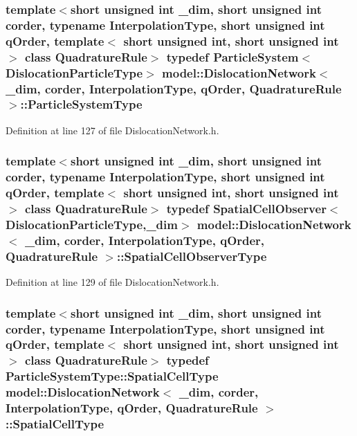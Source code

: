 \subsubsection[{Particle\+System\+Type}]{\setlength{\rightskip}{0pt plus 5cm}template$<$short unsigned int \+\_\+dim, short unsigned int corder, typename Interpolation\+Type, short unsigned int q\+Order, template$<$ short unsigned int, short unsigned int $>$ class Quadrature\+Rule$>$ typedef {\bf Particle\+System}$<${\bf Dislocation\+Particle\+Type}$>$ {\bf model\+::\+Dislocation\+Network}$<$ \+\_\+dim, corder, Interpolation\+Type, q\+Order, Quadrature\+Rule $>$\+::{\bf Particle\+System\+Type}}\label{classmodel_1_1_dislocation_network_aab58d4d3eea7aaa963a2ae6b081a5ecf}


Definition at line 127 of file Dislocation\+Network.\+h.

\hypertarget{classmodel_1_1_dislocation_network_a9a91f24bae6ebbc5bb87361e1d8d1155}{}
\subsubsection[{Spatial\+Cell\+Observer\+Type}]{\setlength{\rightskip}{0pt plus 5cm}template$<$short unsigned int \+\_\+dim, short unsigned int corder, typename Interpolation\+Type, short unsigned int q\+Order, template$<$ short unsigned int, short unsigned int $>$ class Quadrature\+Rule$>$ typedef {\bf Spatial\+Cell\+Observer}$<${\bf Dislocation\+Particle\+Type},\+\_\+dim$>$ {\bf model\+::\+Dislocation\+Network}$<$ \+\_\+dim, corder, Interpolation\+Type, q\+Order, Quadrature\+Rule $>$\+::{\bf Spatial\+Cell\+Observer\+Type}}\label{classmodel_1_1_dislocation_network_a9a91f24bae6ebbc5bb87361e1d8d1155}


Definition at line 129 of file Dislocation\+Network.\+h.

\hypertarget{classmodel_1_1_dislocation_network_ad1ac55fc699ea84f379ab8ea84b83f46}{}
\subsubsection[{Spatial\+Cell\+Type}]{\setlength{\rightskip}{0pt plus 5cm}template$<$short unsigned int \+\_\+dim, short unsigned int corder, typename Interpolation\+Type, short unsigned int q\+Order, template$<$ short unsigned int, short unsigned int $>$ class Quadrature\+Rule$>$ typedef Particle\+System\+Type\+::\+Spatial\+Cell\+Type {\bf model\+::\+Dislocation\+Network}$<$ \+\_\+dim, corder, Interpolation\+Type, q\+Order, Quadrature\+Rule $>$\+::{\bf Spatial\+Cell\+Type}}\label{classmodel_1_1_dislocation_network_ad1ac55fc699ea84f379ab8ea84b83f46}


